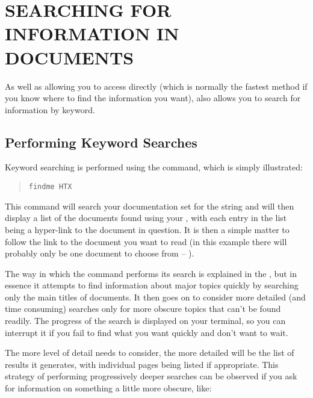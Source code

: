\section{\label{sect:searchingfordocuments}SEARCHING FOR INFORMATION IN DOCUMENTS}

As well as allowing you to access
 directly  (which is normally the fastest method if
you know where to find the information you want),
 also allows you to search for information by
keyword.

\subsection{Performing Keyword Searches}

Keyword searching is performed using the 
command, which is simply illustrated:

\begin{quote}
\begin{verbatim}
findme HTX
\end{verbatim}
\end{quote}

This command will search your documentation set for the string
 and will then display a list of the documents found using
your , with each entry in
the list being a hyper-link to the document in question. It is then a
simple matter to follow the link to the document you want to read (in
this example there will probably only be one document to choose from
-- ).

The way in which the  command performs its search is
explained in the , but in
essence it attempts to find information about major topics quickly by
searching only the main titles of documents. It then goes on to
consider more detailed (and time consuming) searches only for more
obscure topics that can't be found readily. The progress of the search
is displayed on your terminal, so you can interrupt it if you fail to
find what you want quickly and don't want to wait.

The more level of detail  needs to consider, the more
detailed will be the list of results it generates, with individual
 pages being listed if appropriate. This strategy of
performing progressively deeper searches can be observed if you ask
for information on something a little more obscure, like:

